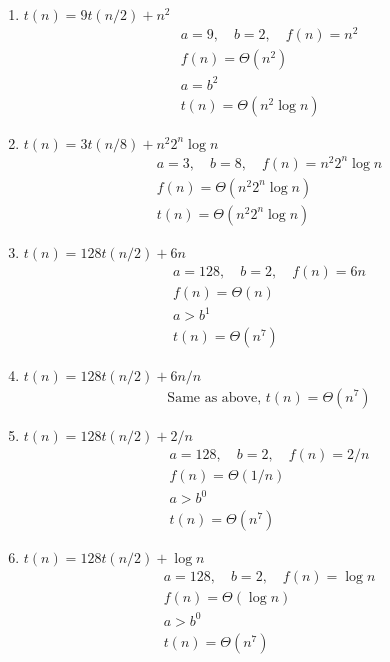 \documentclass{article}
\begin{document}
\begin{enumerate}
    \item \( t(n) = 9t(n/2) + n^2 \)
          \begin{align*}
               & a = 9, \quad b = 2, \quad f(n) = n^2 \\
               & f(n) = \Theta(n^2)                   \\
               & a = b^2                              \\
               & t(n) = \Theta(n^2 \log n)
          \end{align*}

    \item \( t(n) = 3t(n/8) + n^2 2^n \log n \)
          \begin{align*}
               & a = 3, \quad b = 8, \quad f(n) = n^2 2^n \log n \\
               & f(n) = \Theta(n^2 2^n \log n)                   \\
               & t(n) = \Theta(n^2 2^n \log n)
          \end{align*}

    \item \( t(n) = 128t(n/2) + 6n \)
          \begin{align*}
               & a = 128, \quad b = 2, \quad f(n) = 6n \\
               & f(n) = \Theta(n)                      \\
               & a > b^1                               \\
               & t(n) = \Theta(n^7)
          \end{align*}

    \item \( t(n) = 128t(n/2) + 6n / n \)
          \begin{align*}
               & \text{Same as above, } t(n) = \Theta(n^7)
          \end{align*}

    \item \( t(n) = 128t(n/2) + 2/n \)
          \begin{align*}
               & a = 128, \quad b = 2, \quad f(n) = 2/n \\
               & f(n) = \Theta(1/n)                     \\
               & a > b^0                                \\
               & t(n) = \Theta(n^7)
          \end{align*}

    \item \( t(n) = 128t(n/2) + \log n \)
          \begin{align*}
               & a = 128, \quad b = 2, \quad f(n) = \log n \\
               & f(n) = \Theta(\log n)                     \\
               & a > b^0                                   \\
               & t(n) = \Theta(n^7)
          \end{align*}
\end{enumerate}
\end{document}
